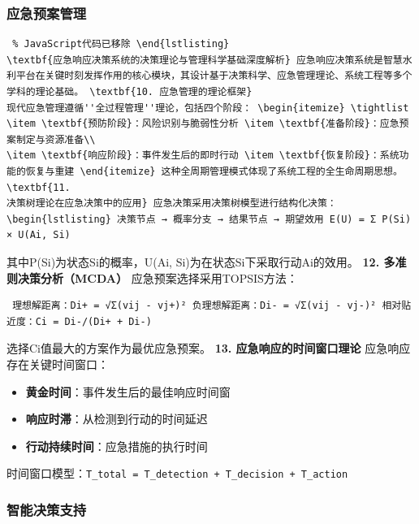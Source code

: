 \subsubsection{应急预案管理}\label{ux5e94ux6025ux9884ux6848ux7ba1ux7406} \begin{lstlisting} % JavaScript代码已移除 \end{lstlisting}
\textbf{应急响应决策系统的决策理论与管理科学基础深度解析} 应急响应决策系统是智慧水利平台在关键时刻发挥作用的核心模块，其设计基于决策科学、应急管理理论、系统工程等多个学科的理论基础。 \textbf{10. 应急管理的理论框架}
现代应急管理遵循''全过程管理''理论，包括四个阶段： \begin{itemize} \tightlist \item \textbf{预防阶段}：风险识别与脆弱性分析 \item \textbf{准备阶段}：应急预案制定与资源准备\\
\item \textbf{响应阶段}：事件发生后的即时行动 \item \textbf{恢复阶段}：系统功能的恢复与重建 \end{itemize} 这种全周期管理模式体现了系统工程的全生命周期思想。 \textbf{11.
决策树理论在应急决策中的应用} 应急决策采用决策树模型进行结构化决策： \begin{lstlisting} 决策节点 → 概率分支 → 结果节点 → 期望效用 E(U) = Σ P(Si) × U(Ai, Si)
\end{lstlisting} 其中P(Si)为状态Si的概率，U(Ai, Si)为在状态Si下采取行动Ai的效用。 \textbf{12. 多准则决策分析（MCDA）} 应急预案选择采用TOPSIS方法：
\begin{lstlisting} 理想解距离：Di+ = √Σ(vij - vj+)² 负理想解距离：Di- = √Σ(vij - vj-)² 相对贴近度：Ci = Di-/(Di+ + Di-) \end{lstlisting}
选择Ci值最大的方案作为最优应急预案。 \textbf{13. 应急响应的时间窗口理论} 应急响应存在关键时间窗口： \begin{itemize} \tightlist \item \textbf{黄金时间}：事件发生后的最佳响应时间窗
\item \textbf{响应时滞}：从检测到行动的时间延迟 \item \textbf{行动持续时间}：应急措施的执行时间 \end{itemize} 时间窗口模型：\texttt{T\_total = T\_detection +
T\_decision + T\_action} \subsubsection{智能决策支持}\label{ux667aux80fdux51b3ux7b56ux652fux6301}
